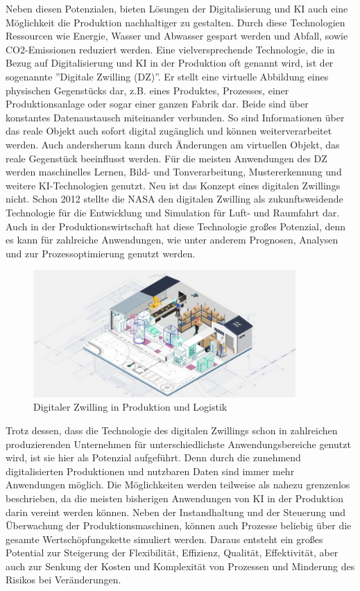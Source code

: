 \documentclass[a4paper,12pt, german]{report}
\begin{document}
Neben diesen Potenzialen, bieten Lösungen der Digitalisierung und KI auch eine Möglichkeit die Produktion nachhaltiger zu gestalten. Durch diese Technologien Ressourcen wie Energie, Wasser und Abwasser gespart werden und Abfall, sowie CO2-Emissionen reduziert werden. \cite{36}\newline
Eine vielversprechende Technologie, die in Bezug auf Digitalisierung und KI in der Produktion oft genannt wird, ist der sogenannte ''Digitale Zwilling (DZ)''. Er stellt eine virtuelle Abbildung eines physischen Gegenstücks dar, z.B. eines Produktes, Prozesses, einer Produktionsanlage oder sogar einer ganzen Fabrik dar. Beide sind über konstantes Datenaustausch miteinander verbunden. So sind Informationen über das reale Objekt auch sofort digital zugänglich und können weiterverarbeitet werden. Auch andersherum kann durch Änderungen am virtuellen Objekt, das reale Gegenstück beeinflusst werden. Für die meisten Anwendungen des DZ werden maschinelles Lernen, Bild- und Tonverarbeitung, Mustererkennung und weitere KI-Technologien genutzt.
Neu ist das Konzept eines digitalen Zwillings nicht. Schon 2012 stellte die NASA den digitalen Zwilling als zukunftsweidende Technologie für die Entwicklung und Simulation für Luft- und Raumfahrt dar. Auch in der Produktionswirtschaft hat diese Technologie großes Potenzial, denn es kann für zahlreiche Anwendungen, wie unter anderem Prognosen, Analysen und zur Prozessoptimierung genutzt werden.\cite{32}

\begin{figure}[H]
  \center
 \includegraphics[width=10cm]{images/DZ.png}
  \caption[Digitaler Zwilling in Produktion und Logistik]{Digitaler Zwilling in Produktion und Logistik \cite{34}}
\end{figure}

Trotz dessen, dass die Technologie des digitalen Zwillings schon in zahlreichen produzierenden Unternehmen für unterschiedlichste Anwendungsbereiche genutzt wird, ist sie hier als Potenzial aufgeführt. Denn durch die zunehmend digitalisierten Produktionen und nutzbaren Daten sind immer mehr Anwendungen möglich. Die Möglichkeiten werden teilweise als nahezu grenzenlos beschrieben, da die meisten bisherigen Anwendungen von KI in der Produktion darin vereint werden können. Neben der Instandhaltung und der Steuerung und Überwachung der Produktionsmaschinen, können auch Prozesse beliebig über die gesamte Wertschöpfungskette simuliert werden. Daraus entsteht ein großes Potential zur Steigerung der Flexibilität, Effizienz, Qualität, Effektivität, aber auch zur Senkung der Kosten und Komplexität von Prozessen und Minderung des Risikos bei Veränderungen.\cite{33}
\end{document}
